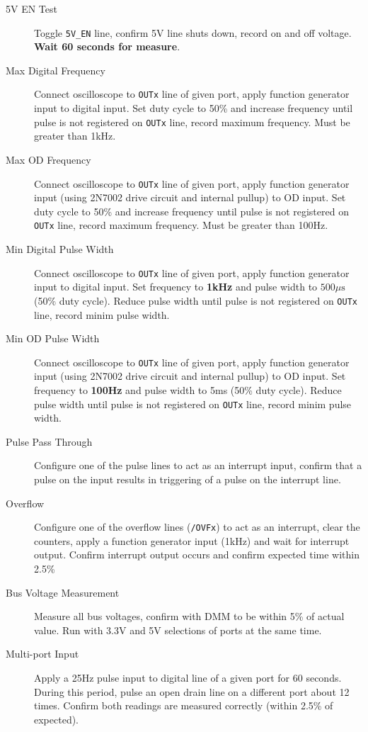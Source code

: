 \begin{description}
\item [5V EN Test] Toggle \texttt{5V\_EN} line, confirm 5V line shuts down, record on and off voltage. \textbf{Wait 60 seconds for measure}.
\item [Max Digital Frequency] Connect oscilloscope to \texttt{OUTx} line of given port, apply function generator input to digital input. Set duty cycle to 50\% and increase frequency until pulse is not registered on \texttt{OUTx} line, record maximum frequency. Must be greater than 1kHz.
\item [Max OD Frequency] Connect oscilloscope to \texttt{OUTx} line of given port, apply function generator input (using 2N7002 drive circuit and internal pullup) to OD input. Set duty cycle to 50\% and increase frequency until pulse is not registered on \texttt{OUTx} line, record maximum frequency. Must be greater than 100Hz.
\item [Min Digital Pulse Width] Connect oscilloscope to \texttt{OUTx} line of given port, apply function generator input to digital input. Set frequency to \textbf{1kHz} and pulse width to $500\mu \text{s}$ (50\% duty cycle). Reduce pulse width until pulse is not registered on \texttt{OUTx} line, record minim pulse width. 
\item [Min OD Pulse Width] Connect oscilloscope to \texttt{OUTx} line of given port, apply function generator input (using 2N7002 drive circuit and internal pullup) to OD input. Set frequency to \textbf{100Hz} and pulse width to 5ms (50\% duty cycle). Reduce pulse width until pulse is not registered on \texttt{OUTx} line, record minim pulse width. 
\item [Pulse Pass Through] Configure one of the pulse lines to act as an interrupt input, confirm that a pulse on the input results in triggering of a pulse on the interrupt line. 
\item [Overflow] Configure one of the overflow lines (\texttt{/OVFx}) to act as an interrupt, clear the counters, apply a function generator input (1kHz) and wait for interrupt output. Confirm interrupt output occurs and confirm expected time within 2.5\%
\item [Bus Voltage Measurement] Measure all bus voltages, confirm with DMM to be within 5\% of actual value. Run with 3.3V and 5V selections of ports at the same time. 
\item [Multi-port Input] Apply a 25Hz pulse input to digital line of a given port for 60 seconds. During this period, pulse an open drain line on a different port about 12 times. Confirm both readings are measured correctly (within 2.5\% of expected).

\end{description}
